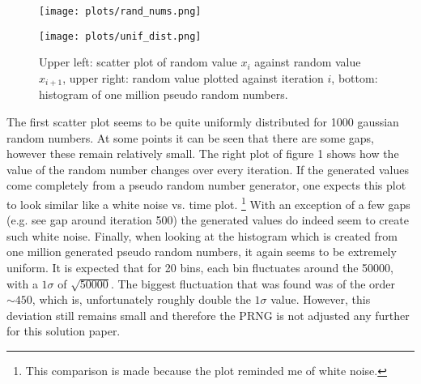 


\begin{figure}[h]
\vspace{-2.2em}
\centering
\texttt{[image: plots/rand\_nums.png]}
\end{figure}

\begin{figure}[h]
\centering
\texttt{[image: plots/unif\_dist.png]}
\caption{Upper left: scatter plot of random value $x_i$ against random value $x_{i+1}$, upper right:  random value plotted against iteration $i$, bottom: histogram of one million pseudo random numbers.}
\end{figure}
The first scatter plot seems to be quite uniformly distributed for 1000 gaussian random numbers. At some points it can be seen that there are some gaps, however these remain relatively small. The right plot of figure 1 shows how the value of the random number changes over every iteration. If the generated values come completely from a pseudo random number generator, one expects this plot to look similar like a white noise vs. time plot. \footnote{This comparison is made because the plot reminded me of white noise.} With an exception of a few gaps (e.g. see gap around iteration 500) the generated values do indeed seem to create such white noise. Finally, when looking at the histogram which is created from one million generated pseudo random numbers, it again seems to be extremely uniform. It is expected that for 20 bins, each bin fluctuates around the 50000, with a $1\sigma$ of $\sqrt{50000}$. The biggest fluctuation that was found was of the order $\sim 450$, which is, unfortunately roughly double the $1\sigma$ value. However, this deviation still remains small and therefore the PRNG is not adjusted any further for this solution paper.

